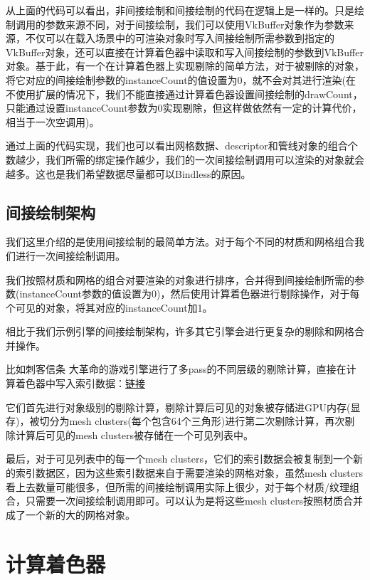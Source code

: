 \documentclass{ctexart}
\begin{document}
从上面的代码可以看出，非间接绘制和间接绘制的代码在逻辑上是一样的。只是绘制调用的参数来源不同，对于间接绘制，我们可以使用VkBuffer对象作为参数来源，不仅可以在载入场景中的可渲染对象时写入间接绘制所需参数到指定的VkBuffer对象，还可以直接在计算着色器中读取和写入间接绘制的参数到VkBuffer对象。基于此，有一个在计算着色器上实现剔除的简单方法，对于被剔除的对象，将它对应的间接绘制参数的instanceCount的值设置为0，就不会对其进行渲染(在不使用扩展的情况下，我们不能直接通过计算着色器设置间接绘制的drawCount，只能通过设置instanceCount参数为0实现剔除，但这样做依然有一定的计算代价，相当于一次空调用)。

通过上面的代码实现，我们也可以看出网格数据、descriptor和管线对象的组合个数越少，我们所需的绑定操作越少，我们的一次间接绘制调用可以渲染的对象就会越多。这也是我们希望数据尽量都可以Bindless的原因。

\subsection{间接绘制架构}

我们这里介绍的是使用间接绘制的最简单方法。对于每个不同的材质和网格组合我们进行一次间接绘制调用。

我们按照材质和网格的组合对要渲染的对象进行排序，合并得到间接绘制所需的参数(instanceCount参数的值设置为0)，然后使用计算着色器进行剔除操作，对于每个可见的对象，将其对应的instanceCount加1。

相比于我们示例引擎的间接绘制架构，许多其它引擎会进行更复杂的剔除和网格合并操作。

比如刺客信条 大革命的游戏引擎进行了多pass的不同层级的剔除计算，直接在计算着色器中写入索引数据：\href{https://www.advances.realtimerendering.com/s2015/aaltonenhaar_siggraph2015_combined_final_footer_220dpi.pdf}{链接}

它们首先进行对象级别的剔除计算，剔除计算后可见的对象被存储进GPU内存(显存)，被切分为mesh clusters(每个包含64个三角形)进行第二次剔除计算，再次剔除计算后可见的mesh clusters被存储在一个可见列表中。

最后，对于可见列表中的每一个mesh clusters，它们的索引数据会被复制到一个新的索引数据区，因为这些索引数据来自于需要渲染的网格对象，虽然mesh clusters看上去数量可能很多，但所需的间接绘制调用实际上很少，对于每个材质/纹理组合，只需要一次间接绘制调用即可。可以认为是将这些mesh clusters按照材质合并成了一个新的大的网格对象。

\newpage
\section{计算着色器}
\end{document}
